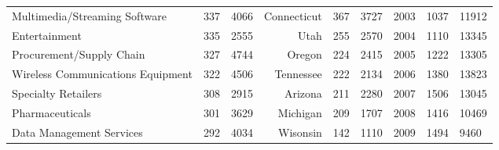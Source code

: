 \begin{table}[!htb]
\begin{tabular}{p{3.5cm}llrllrll}
  Multimedia/Streaming Software & 337 & 4066 & Connecticut & 367 & 3727 & 2003 & 1037 & 11912 \\ 
  Entertainment & 335 & 2555 & Utah & 255 & 2570 & 2004 & 1110 & 13345 \\ 
  Procurement/Supply Chain & 327 & 4744 & Oregon & 224 & 2415 & 2005 & 1222 & 13305 \\ 
  Wireless Communications Equipment & 322 & 4506 & Tennessee & 222 & 2134 & 2006 & 1380 & 13823 \\ 
  Specialty Retailers & 308 & 2915 & Arizona & 211 & 2280 & 2007 & 1506 & 13045 \\ 
  Pharmaceuticals & 301 & 3629 & Michigan & 209 & 1707 & 2008 & 1416 & 10469 \\ 
  Data Management Services & 292 & 4034 & Wisonsin & 142 & 1110 & 2009 & 1494 & 9460 \\ 
   \bottomrule
\end{tabular}
\endgroup


\end{table}
